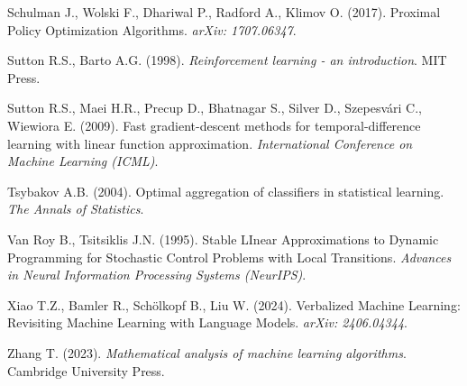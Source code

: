 %
{Schulman J., Wolski F., Dhariwal P., Radford A., Klimov O. (2017). Proximal Policy Optimization Algorithms. \textit{arXiv: 1707.06347}.}

%
{Sutton R.S., Barto A.G. (1998). \textit{Reinforcement learning - an introduction}. MIT Press.}

%
{Sutton R.S., Maei H.R., Precup D., Bhatnagar S., Silver D., Szepesv{\'a}ri C., Wiewiora E. (2009). Fast gradient-descent methods for temporal-difference learning with linear function approximation. \textit{International Conference on Machine Learning (ICML)}.}

%
{Tsybakov A.B. (2004). Optimal aggregation of classifiers in statistical learning. \textit{The Annals of Statistics}.}

%
{Van Roy B., Tsitsiklis J.N. (1995). Stable LInear Approximations to Dynamic Programming for Stochastic Control Problems with Local Transitions. \textit{Advances in Neural Information Processing Systems (NeurIPS)}.}

%
{Xiao T.Z., Bamler R., Schölkopf B., Liu W. (2024). Verbalized Machine Learning: Revisiting Machine Learning with Language Models. \textit{arXiv: 2406.04344}.}

%
{Zhang T. (2023). \textit{Mathematical analysis of machine learning algorithms}. Cambridge University Press.}

